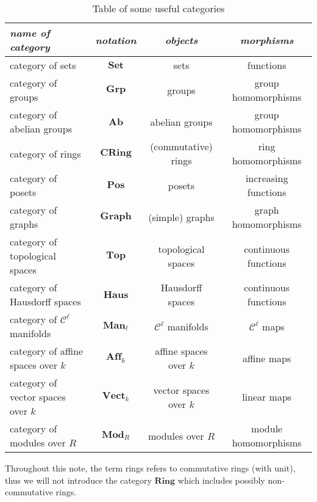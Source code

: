 \documentclass[11pt]{book}
\begin{document}
\begin{table}[ht]
\centering
\caption{Table of some useful categories}
\vspace{3mm}
\begin{tabular}[t]{l|c|c|c}
\textit{name of category} & \textit{notation} & \textit{objects} & \textit{morphisms}\\
\hline
category of sets &$\mathbf{Set}$ & sets & functions\\
category of groups & $\mathbf{Grp}$ & groups & group homomorphisms\\
category of abelian groups & $\mathbf{Ab}$ & abelian groups & group homomorphisms \\
category of rings & $\mathbf{CRing}$ & (commutative) rings & ring homomorphisms\\
category of posets & $\mathbf{Pos}$ & posets & increasing functions\\
category of graphs & $\mathbf{Graph}$ & (simple) graphs & graph homomorphisms\\
category of topological spaces & $\mathbf{Top}$ & topological spaces & continuous functions\\
category of Hausdorff spaces & $\mathbf{Haus}$ & Hausdorff spaces & continuous functions\\
category of $\mathscr{C}^\ell$ manifolds & $\mathbf{Man}_{\ell}$ & $\mathscr{C}^\ell$ manifolds & $\mathscr{C}^\ell$ maps\\
category of affine spaces over $k$ & $\mathbf{Aff}_k$ & affine spaces over $k$ & affine maps\\
category of vector spaces over $k$ & $\mathbf{Vect}_k$ & vector spaces over $k$ & linear maps\\
category of modules over $R$ & $\mathbf{Mod}_R$ & modules over $R$ & module homomorphisms\\
\end{tabular}
\label{tab:cat}
\end{table}
\begin{remark}Throughout this note, the term rings refers to commutative rings (with unit), thus we will not introduce the category $\mathbf{Ring}$ which includes possibly non-commutative rings.
\end{remark}
\end{document}
